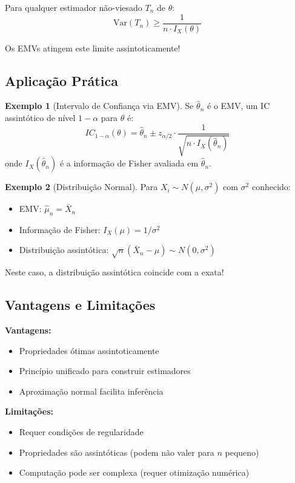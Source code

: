 \documentclass[12pt,a4paper]{article}
\theoremstyle{definition}
\newtheorem{exemplo}{Exemplo}[section]
\theoremstyle{plain}
\begin{document}
Para qualquer estimador não-viesado $T_n$ de $\theta$:
\[
\text{Var}(T_n) \geq \frac{1}{n \cdot I_X(\theta)}
\]

Os EMVs atingem este limite assintoticamente!

\subsection{Aplicação Prática}

\begin{exemplo}[Intervalo de Confiança via EMV]
Se $\hat{\theta}_n$ é o EMV, um IC assintótico de nível $1-\alpha$ para $\theta$ é:
\[
IC_{1-\alpha}(\theta) = \hat{\theta}_n \pm z_{\alpha/2} \cdot \frac{1}{\sqrt{n \cdot I_X(\hat{\theta}_n)}}
\]
onde $I_X(\hat{\theta}_n)$ é a informação de Fisher avaliada em $\hat{\theta}_n$.
\end{exemplo}

\begin{exemplo}[Distribuição Normal]
Para $X_i \sim N(\mu, \sigma^2)$ com $\sigma^2$ conhecido:
\begin{itemize}
    \item EMV: $\hat{\mu}_n = \bar{X}_n$
    \item Informação de Fisher: $I_X(\mu) = 1/\sigma^2$
    \item Distribuição assintótica: $\sqrt{n}(\bar{X}_n - \mu) \sim N(0, \sigma^2)$
\end{itemize}

Neste caso, a distribuição assintótica coincide com a exata!
\end{exemplo}

\subsection{Vantagens e Limitações}

\textbf{Vantagens:}
\begin{itemize}
    \item Propriedades ótimas assintoticamente
    \item Princípio unificado para construir estimadores
    \item Aproximação normal facilita inferência
\end{itemize}

\textbf{Limitações:}
\begin{itemize}
    \item Requer condições de regularidade
    \item Propriedades são assintóticas (podem não valer para $n$ pequeno)
    \item Computação pode ser complexa (requer otimização numérica)
\end{itemize}
\end{document}
